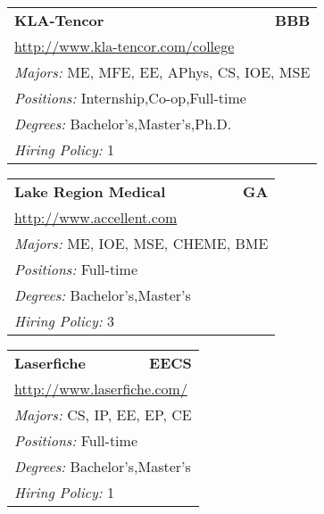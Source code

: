 \documentclass[twoside]{article}
\begin{document}
\begin{center}
\begin{multicols}{3}
\begin{FlushLeft}
\begin{minipage}{.9\columnwidth}
\end{minipage}
 
\begin{minipage}{.9\columnwidth}\begin{tabularx}{.95\columnwidth}{Xr}
                 {\Large\bf KLA-Tencor} & {\Large\bf BBB}\\
    \multicolumn{2}{p{.95\columnwidth}}{\url{http://www.kla-tencor.com/college}}\\
    \multicolumn{2}{p{.95\columnwidth}}{\emph{Majors:} ME, MFE, EE, APhys, CS, IOE, MSE}\\
    \multicolumn{2}{p{.95\columnwidth}}{\emph{Positions:} Internship,Co-op,Full-time}\\
    \multicolumn{2}{p{.95\columnwidth}}{\emph{Degrees:} Bachelor's,Master's,Ph.D.}\\
    \multicolumn{2}{p{.95\columnwidth}}{\emph{Hiring Policy:} 1}\\
    \end{tabularx}
    
\end{minipage}
 
\begin{minipage}{.9\columnwidth}\begin{tabularx}{.95\columnwidth}{Xr}
                 {\Large\bf Lake Region Medical} & {\Large\bf GA}\\
    \multicolumn{2}{p{.95\columnwidth}}{\url{http://www.accellent.com}}\\
    \multicolumn{2}{p{.95\columnwidth}}{\emph{Majors:} ME, IOE, MSE, CHEME, BME}\\
    \multicolumn{2}{p{.95\columnwidth}}{\emph{Positions:} Full-time}\\
    \multicolumn{2}{p{.95\columnwidth}}{\emph{Degrees:} Bachelor's,Master's}\\
    \multicolumn{2}{p{.95\columnwidth}}{\emph{Hiring Policy:} 3}\\
    \end{tabularx}
    
\end{minipage}
 
\begin{minipage}{.9\columnwidth}\begin{tabularx}{.95\columnwidth}{Xr}
                 {\Large\bf Laserfiche} & {\Large\bf EECS}\\
    \multicolumn{2}{p{.95\columnwidth}}{\url{http://www.laserfiche.com/}}\\
    \multicolumn{2}{p{.95\columnwidth}}{\emph{Majors:} CS, IP, EE, EP, CE}\\
    \multicolumn{2}{p{.95\columnwidth}}{\emph{Positions:} Full-time}\\
    \multicolumn{2}{p{.95\columnwidth}}{\emph{Degrees:} Bachelor's,Master's}\\
    \multicolumn{2}{p{.95\columnwidth}}{\emph{Hiring Policy:} 1}\\
    \end{tabularx}
    

\end{minipage}
\end{FlushLeft}
\end{multicols}
\end{center}
\end{document}
